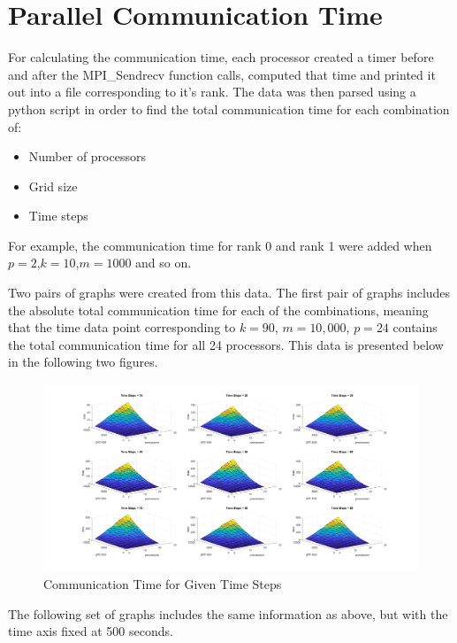 \documentclass[a4paper, 11pt]{article}
\begin{document}
\section*{Parallel Communication Time}
For calculating the communication time, each processor created a timer before and after the MPI\_Sendrecv function calls, computed that time and printed it out into a file corresponding to it's rank. The data was then parsed using a python script in order to find the total communication time for each combination of:
\begin{itemize}
	\item Number of processors
	\item Grid size
	\item Time steps
\end{itemize}

For example, the communication time for rank 0 and rank 1 were added when $p=2$,$k=10$,$m=1000$ and so on.

Two pairs of graphs were created from this data. The first pair of graphs includes the absolute total communication time for each of the combinations, meaning that the time data point corresponding to $k=90$, $m=10,000$, $p=24$ contains the total communication time for all 24 processors. This data is presented below in the following two figures.
\begin{figure}[H]
	\centering
	\centerline{\includegraphics[width=7.5in]{comm_time.png}}
	\caption{Communication Time for Given Time Steps}
\end{figure}

The following set of graphs includes the same information as above, but with the time axis fixed at 500 seconds.
\end{document}

